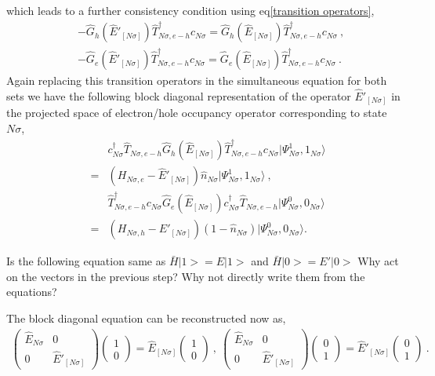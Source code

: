 \documentclass[12pt,a4paper]{article}
\begin{document}
which leads to a further consistency condition using eq\eqref{transition operators},
\begin{eqnarray}
&&-\hat{G}_{h}(\hat{E}'_{[N\sigma]})\hat{T}^{\dagger}_{N\sigma,e-h}c_{N\sigma} = \hat{G}_{h}(\hat{E}_{[N\sigma]})\hat{T}^{\dagger}_{N\sigma,e-h}c_{N\sigma}~,~\nonumber\\
&&-\hat{G}_{e}(\hat{E}'_{[N\sigma]})\hat{T}^{\dagger}_{N\sigma,e-h}c_{N\sigma} = \hat{G}_{e}(\hat{E}_{[N\sigma]})\hat{T}^{\dagger}_{N\sigma,e-h}c_{N\sigma}~.~~\label{consistency}
\end{eqnarray}
Again replacing this transition operators in the simultaneous equation for both sets we have the following block diagonal representation of the operator $\hat{E}'_{[N\sigma]}$ in the projected space of electron/hole occupancy operator corresponding to state $N\sigma$,
\begin{eqnarray}
&&c^{\dagger}_{N\sigma}\hat{T}_{N\sigma,e-h}\hat{G}_{h}(\hat{E}_{[N\sigma]})\hat{T}^{\dagger}_{N\sigma,e-h}c_{N\sigma}|\Psi^{1}_{N\sigma},1_{N\sigma}\rangle\nonumber\\
 &=& (H_{N\sigma,e}-\hat{E}'_{[N\sigma]})\hat{n}_{N\sigma}|\Psi^{1}_{N\sigma},1_{N\sigma}\rangle~,~\nonumber\\
&&\hat{T}^{\dagger}_{N\sigma,e-h}c_{N\sigma}\hat{G}_{e}(\hat{E}_{[N\sigma]})c^{\dagger}_{N\sigma}\hat{T}_{N\sigma,e-h}|\Psi^{0}_{N\sigma},0_{N\sigma}\rangle\nonumber\\
& =& (H_{N\sigma,h}-\hat{E}'_{[N\sigma]})(1-\hat{n}_{N\sigma})|\Psi^{0}_{N\sigma},0_{N\sigma}\rangle. 
\label{block_diag2}
\end{eqnarray}
\begin{tcolorbox}
Is the following equation same as \(\bar{H}| 1>=E| 1>\) and \(\bar{H}| 0>=E'| 0>\) Why act on the vectors in the previous step? Why not directly write them from the equations?
\end{tcolorbox}
The block diagonal equation can be reconstructed now as,
\begin{eqnarray}
\begin{pmatrix}
\hat{E}_{N\sigma} & 0 \\
0 & \hat{E}'_{[N\sigma]}
\end{pmatrix}\begin{pmatrix}
1 \\ 0 
\end{pmatrix} = \hat{E}_{[N\sigma]} \begin{pmatrix}
1 \\ 0 
\end{pmatrix}~,~\begin{pmatrix}
\hat{E}_{N\sigma} & 0 \\
0 & \hat{E}'_{[N\sigma]}
\end{pmatrix}\begin{pmatrix}
0 \\ 1 
\end{pmatrix} = \hat{E}'_{[N\sigma]} \begin{pmatrix}
0 \\ 1 
\end{pmatrix}~.\label{block_diag_eqn}
\end{eqnarray}
\end{document}
